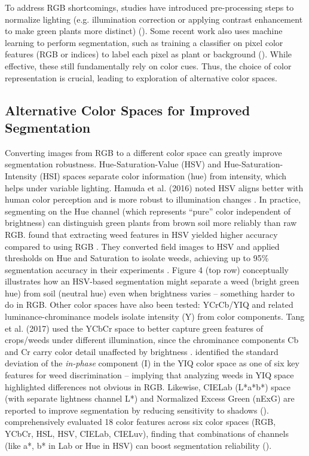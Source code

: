 \documentclass[letterpaper]{report}
\begin{document}
%
To address RGB shortcomings, studies have introduced pre-processing steps to normalize lighting (e.g. illumination correction or applying contrast enhancement to make green plants more distinct) (\cite{Lu2022-rq}). Some recent work also uses machine learning to perform segmentation, such as training a classifier on pixel color features (RGB or indices) to label each pixel as plant or background (\cite{Gee2020-cz}). While effective, these still fundamentally rely on color cues. Thus, the choice of color representation is crucial, leading to exploration of alternative color spaces.
%
\subsection{Alternative Color Spaces  for Improved Segmentation}  
Converting images from RGB to a different color space can greatly improve segmentation robustness. Hue-Saturation-Value (HSV) and Hue-Saturation-Intensity (HSI) spaces separate color information (hue) from intensity, which helps under variable lighting. Hamuda et al. (2016) noted HSV aligns better with human color perception and is more robust to illumination changes \parencite{Hamuda2017-nf}. In practice, segmenting on the Hue channel (which represents “pure” color independent of brightness) can distinguish green plants from brown soil more reliably than raw RGB. \citeauthor{Priya2019-zw} found that extracting weed features in HSV yielded higher accuracy compared to using RGB \parencite{Priya2019-zw}. They converted field images to HSV and applied thresholds on Hue and Saturation to isolate weeds, achieving up to 95\% segmentation accuracy in their experiments . Figure 4 (top row) conceptually illustrates how an HSV-based segmentation might separate a weed (bright green hue) from soil (neutral hue) even when brightness varies – something harder to do in RGB. 
%
Other color spaces have also been tested: YCrCb/YIQ and related luminance-chrominance models isolate intensity (Y) from color components. Tang et al. (2017) used the YCbCr space to better capture green features of crops/weeds under different illumination, since the chrominance components Cb and Cr carry color detail unaffected by brightness \parencite{Wu2021-gt}. \citeauthor{Sabzi2020-af} identified the standard deviation of the \textit{in-phase} component (I) in the YIQ color space as one of six key features for weed discrimination \parencite{Sabzi2020-af} – implying that analyzing weeds in YIQ space highlighted differences not obvious in RGB. Likewise, CIELab (L*a*b*) space (with separate lightness channel L*) and Normalized Excess Green (nExG) are reported to improve segmentation by reducing sensitivity to shadows (\parencite{Wu2021-gt}). \citeauthor{Guo2013-eq} comprehensively evaluated 18 color features across six color spaces (RGB, YCbCr, HSL, HSV, CIELab, CIELuv), finding that combinations of channels (like a*, b* in Lab or Hue in HSV) can boost segmentation reliability (\cite{Guo2013-eq}).  
\end{document}
